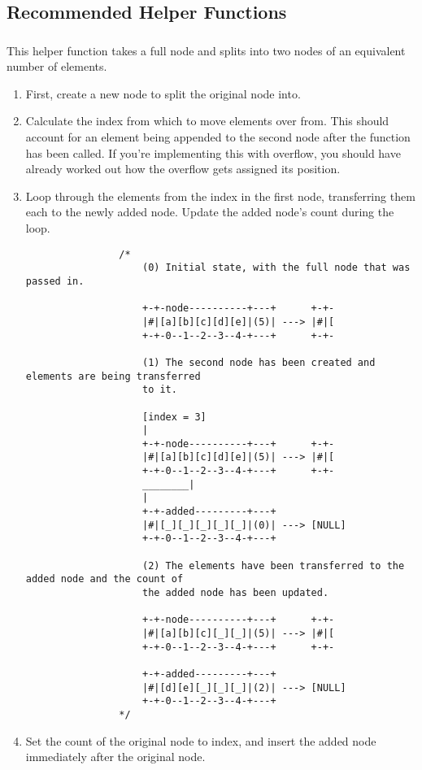 \subsection{Recommended Helper Functions}
\label{section:rec_helper}


\subsubsection{}

This helper function takes a full node and splits into two nodes of an
 equivalent number of elements.

\begin{enumerate}
	\item First, create a new node to split the original node into.

	\item Calculate the index from which to move elements over from. This should
	      account for an element being appended to the second node after the
	      function has been called. If you're implementing this with overflow,
	      you should have already worked out how the overflow gets assigned its
	      position.

	\item Loop through the elements from the index in the first node, transferring
	      them each to the newly added node. Update the added node's count during
	      the loop.

	      \begin{verbatim}
				/*
					(0) Initial state, with the full node that was passed in.

					+-+-node----------+---+      +-+-
					|#|[a][b][c][d][e]|(5)| ---> |#|[
					+-+-0--1--2--3--4-+---+      +-+-

					(1) The second node has been created and elements are being transferred
					to it.

					[index = 3]
					|
					+-+-node----------+---+      +-+-
					|#|[a][b][c][d][e]|(5)| ---> |#|[
					+-+-0--1--2--3--4-+---+      +-+-
					________|
					|
					+-+-added---------+---+
					|#|[_][_][_][_][_]|(0)| ---> [NULL]
					+-+-0--1--2--3--4-+---+

					(2) The elements have been transferred to the added node and the count of
					the added node has been updated.

					+-+-node----------+---+      +-+-
					|#|[a][b][c][_][_]|(5)| ---> |#|[
					+-+-0--1--2--3--4-+---+      +-+-

					+-+-added---------+---+
					|#|[d][e][_][_][_]|(2)| ---> [NULL]
					+-+-0--1--2--3--4-+---+
				*/
		\end{verbatim}

	\item Set the count of the original node to index, and insert the added node
	      immediately after the original node.
\end{enumerate}



